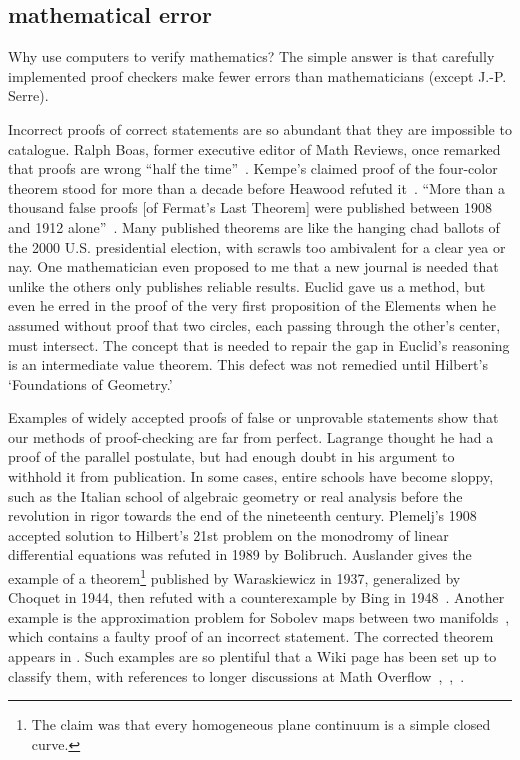 \documentclass{llncs}
\begin{document}

\subsection{mathematical error}

Why use computers to verify mathematics?  The simple answer is that
carefully implemented proof checkers make fewer errors than
mathematicians (except J.-P. Serre).

Incorrect proofs of correct statements are so abundant that they are
impossible to catalogue.  Ralph Boas, former executive editor of Math
Reviews, once remarked that proofs are wrong ``half the
time''~\cite{Aus}. Kempe's claimed proof of the four-color theorem
stood for more than a decade before Heawood refuted
it~\cite[p.~115]{Mac}.  ``More than a thousand false proofs [of
Fermat's Last Theorem] were published between 1908 and 1912
alone''~\cite{Corry}.  Many published theorems are like the hanging
chad ballots of the 2000 U.S. presidential election, with scrawls too
ambivalent for a clear yea or nay.  One mathematician even proposed to
me that a new journal is needed that unlike the others only publishes
reliable results.  Euclid gave us a method, but even he erred in the
proof of the very first proposition of the Elements when he assumed
without proof that two circles, each passing through the other's
center, must intersect.  The concept that is needed to repair the gap
in Euclid's reasoning is an intermediate value theorem.  This defect
was not remedied until Hilbert's `Foundations of Geometry.'

Examples of widely accepted proofs of false or unprovable statements
show that our methods of proof-checking are far from perfect.
Lagrange thought he had a proof of the parallel postulate, but had
enough doubt in his argument to withhold it from publication.  In some
cases, entire schools have become sloppy, such as the Italian school
of algebraic geometry or real analysis before the revolution in rigor
towards the end of the nineteenth century.  Plemelj's 1908 accepted
solution to Hilbert's 21st problem on the monodromy of linear
differential equations was refuted in 1989 by Bolibruch.  Auslander
gives the example of a theorem\footnote{The claim was that every
  homogeneous plane continuum is a simple closed curve.}  published by
Waraskiewicz in 1937, generalized by Choquet in 1944, then refuted
with a counterexample by Bing in 1948~\cite{Aus}.  Another
example
is the approximation problem for Sobolev maps between two
manifolds~\cite{Bethuel}, which contains a faulty proof of an
incorrect statement.  The corrected theorem appears in \cite{Hang}.
Such examples are so plentiful that a Wiki page has been set up to
classify them, with references to longer discussions at Math
Overflow~\cite{WikiPIP},~\cite{Over2},~\cite{Over1}.
\end{document}
